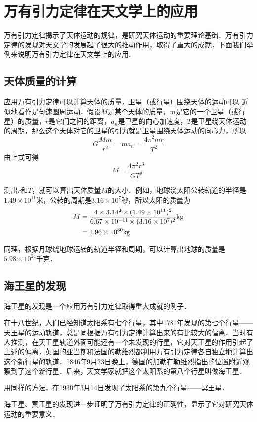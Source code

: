 \section{万有引力定律在天文学上的应用}
万有引力定律揭示了天体运动的规律，是研究天体运动的重要理论基础．万有引力定律的发现对天文学的发展起了很大的推动作用，取得了重大的成就．下面我们举例来说明万有引力定律在天文学上的应用．

\subsection{天体质量的计算} 

应用万有引力定律可以计算天体的质量．卫星（或行星）围绕天体的运动可以
近似地看作是匀速圆周运动．假设$M$是某个天体的质量，$m$是它的一个卫星（或行星）的质量，$r$是它们之间的距离，$a_n$是卫星的向心加速度，$T$是卫星绕天体运动的周期，那么这个天体对它的卫星的引力就是卫星围绕天体运动的向心力，所以
\[G\frac{Mm}{r^2}=ma_n=\frac{4\pi^2 mr}{T^2} \]
由上式可得
\[M=\frac{4\pi^2r^3}{GT^2} \]

测出$r$和$T$，就可以算出天体质量$M$的大小．例如，地球绕太阳公转轨道的半径是$1.49\times 10^{11}$米，公转的周期是$3.16\times 10^7$秒，所以太阳的质量为
\[\begin{split}
M&= \frac{4\times 3.14^2\times (1.49\times 10^{11})^2}{6.67\times 10^{-11}\times (3.16\times 10^7)^2}{\rm kg}\\
&=1.96\times 10^{30}{\rm kg}
\end{split} \]


同理，根据月球绕地球运转的轨道半径和周期，可以计算出地球的质量是$5. 98\times 10^{24}$千克．

\subsection{海王星的发现} 

海王星的发现是一个应用万有引力定律取得重大成就的例子．

在十八世纪，人们已经知道太阳系有七个行星，其中1781年发现的第七个行星——天王星的运动轨道，总是同根据万有引力定律计算出来的有比较大的偏离．当时有人推测，在天王星轨道外面可能还有一个未发现的行星，它对天王星的作用引起了上述的偏离．英国的亚当斯和法国的勒维烈都利用万有引力定律各自独立地计算出这个新行星的轨道．1846年9月23日晚上，德国的加勒在勒维烈指出的位置附近观察到了这个新行星．后来，天文学家就把这个太阳系的第八个行星叫做海王星．

用同样的方法，在1930年3月14日发现了太阳系的第九个行星——冥王星．

海王星、冥王星的发现进一步证明了万有引力定律的正确性，显示了它对研究天体运动的重要意义．

